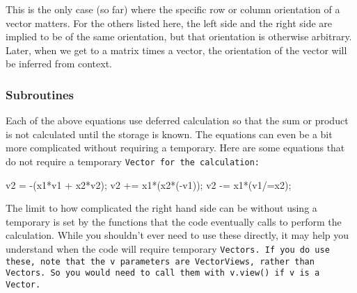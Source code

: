 This is the only case (so far)
where the specific row or column orientation of a vector matters.  For the others
listed here, the left side and the right side are implied to be of the same orientation, but
that orientation is otherwise arbitrary.
Later, when we get to a matrix times a vector, the orientation 
of the vector will be inferred from context.

\subsubsection{Subroutines}

Each of the above equations use deferred calculation so that the sum or product is not calculated
until the storage is known.  The equations can even be a bit more complicated without 
requiring a temporary.  Here are some equations that do not require a temporary 
\tt{Vector} for the calculation:

\begin{tmvcode}
v2 = -(x1*v1 + x2*v2);
v2 += x1*(x2*(-v1));
v2 -= x1*(v1/=x2);
\end{tmvcode}

The limit to how complicated the right hand side can be without using a 
temporary is set by the 
functions that the code eventually calls to perform the calculation.  
While you shouldn't ever
need to use these directly, it may help you understand when the code will require 
temporary \tt{Vector}s.  If you do use these, note that the \tt{v} parameters
are \tt{VectorView}s, rather than \tt{Vector}s.  So you would need to 
call them with \tt{v.view()} if \tt{v} is a \tt{Vector}.

